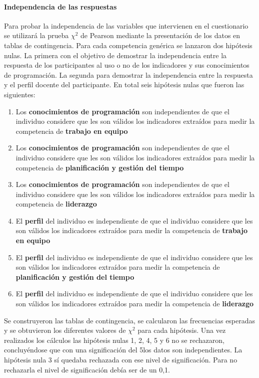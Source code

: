 \paragraph{Independencia de las respuestas}

Para probar la independencia de las variables que intervienen en el cuestionario se utilizará la prueba $\chi^2$ de Pearson mediante la presentación de los datos en tablas de contingencia. Para cada competencia genérica se lanzaron dos hipótesis nulas. La primera con el objetivo de demostrar la independencia entre la respuesta de los participantes al uso o no de los indicadores y sus conocimientos de programación. La segunda para demostrar la independencia entre la respuesta y el perfil docente del participante. En total seis hipótesis nulas que fueron las siguientes:

\begin{enumerate}
\item Los \textbf{conocimientos de programación} son independientes de que el individuo considere que les son válidos los indicadores extraídos para medir la competencia de \textbf{trabajo en equipo}
\item Los \textbf{conocimientos de programación} son independientes de que el individuo considere que les son válidos los indicadores extraídos para medir la competencia de \textbf{planificación y gestión del tiempo}
\item Los \textbf{conocimientos de programación} son independientes de que el individuo considere que les son válidos los indicadores extraídos para medir la competencia de \textbf{liderazgo}
\item El \textbf{perfil} del individuo es independiente de que el individuo considere que les son válidos los indicadores extraídos para medir la competencia de \textbf{trabajo en equipo}
\item El \textbf{perfil} del individuo es independiente de que el individuo considere que les son válidos los indicadores extraídos para medir la competencia de \textbf{planificación y gestión del tiempo}
\item El \textbf{perfil} del individuo es independiente de que el individuo considere que les son válidos los indicadores extraídos para medir la competencia de \textbf{liderazgo}
\end{enumerate}

Se construyeron las tablas de contingencia, se calcularon las frecuencias esperadas y se obtuvieron los diferentes valores de $\chi^2$ para cada hipótesis. Una vez realizados los cálculos las hipótesis nulas 1, 2, 4, 5 y 6 no se rechazaron, concluyéndose que con una significación del 5\percentage {  }los datos son independientes. La hipótesis nula 3 sí quedaba rechazada con ese nivel de significación. Para no rechazarla el nivel de significación debía ser de un 0,1\percentage.

